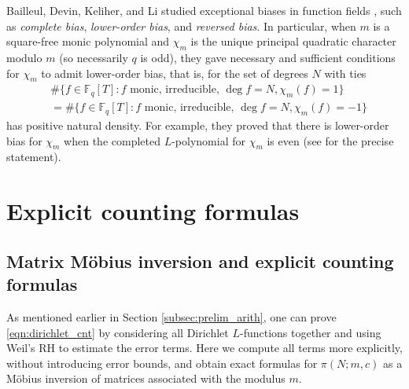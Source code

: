 \documentclass[10pt,reqno]{amsproc}
\newcommand{\bF}{\mathbb{F}}
\newcommand{\1}{\mathds{1}}	%
\theoremstyle{definition}
\theoremstyle{remark}
\begin{document}
Bailleul, Devin, Keliher, and Li studied exceptional biases in function fields \cite{bailleul2024exceptional}, such as \emph{complete bias}, \emph{lower-order bias}, and \emph{reversed bias}.
In particular, when $m$ is a square-free monic polynomial and $\chi_m$ is the unique principal quadratic character modulo $m$ (so necessarily $q$ is odd), they gave necessary and sufficient conditions for $\chi_m$ to admit lower-order bias, that is, for the set of degrees $N$ with ties
\begin{equation}
\begin{aligned}
    &\# \{ f \in \bF_q[T] : f\text{ monic, irreducible, } \deg f = N, \chi_m(f) = 1\} \\
    &= \# \{ f \in \bF_q[T] : f\text{ monic, irreducible, } \deg f = N, \chi_m(f) = -1\} 
\end{aligned}
\end{equation}
has positive natural density.
For example, they proved that there is lower-order bias for $\chi_m$ when the completed $L$-polynomial for $\chi_m$ is even (see \cite[Lemma 5.2]{bailleul2024exceptional} for the precise statement).

\section{Explicit counting formulas}
\label{sec:explicit}

\subsection{Matrix M\"obius inversion and explicit counting formulas}

As mentioned earlier in Section \ref{subsec:prelim_arith}, one can prove \eqref{eqn:dirichlet_cnt} by considering all Dirichlet $L$-functions together and using Weil's RH to estimate the error terms.
Here we compute all terms more explicitly, without introducing error bounds, and obtain exact formulas for $\pi(N; m, c)$ as a M\"obius inversion of matrices associated with the modulus $m$.
\end{document}
